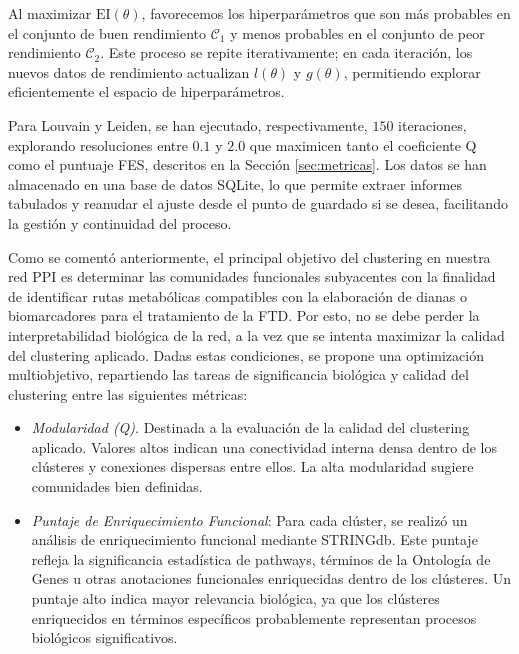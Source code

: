 Al maximizar \( \mathrm{EI}(\theta) \), favorecemos los hiperparámetros que son más probables en el conjunto de buen rendimiento \( \mathcal{C}_1 \) y menos probables en el conjunto de peor rendimiento \( \mathcal{C}_2 \). Este proceso se repite iterativamente; en cada iteración, los nuevos datos de rendimiento actualizan \( l(\theta) \) y \( g(\theta) \), permitiendo explorar eficientemente el espacio de hiperparámetros.

Para Louvain y Leiden, se han ejecutado, respectivamente, \(150\) iteraciones, explorando resoluciones entre \(0.1\) y \(2.0\) que maximicen tanto el coeficiente Q como el puntuaje FES, descritos en la Sección \ref{sec:metricas}. Los datos se han almacenado en una base de datos SQLite, lo que permite extraer informes tabulados y reanudar el ajuste desde el punto de guardado si se desea, facilitando la gestión y continuidad del proceso.


Como se comentó anteriormente, el principal objetivo del clustering en nuestra red PPI es determinar las comunidades funcionales subyacentes con la finalidad de identificar rutas metabólicas compatibles con la elaboración de dianas o biomarcadores para el tratamiento de la FTD. Por esto, no se debe perder la interpretabilidad biológica de la red, a la vez que se intenta maximizar la calidad del clustering aplicado. Dadas estas condiciones, se propone una optimización multiobjetivo, repartiendo las tareas de significancia biológica y calidad del clustering entre las siguientes métricas:

\begin{itemize}
	\item \textit{Modularidad (Q)}. Destinada a la evaluación de la calidad del clustering aplicado. Valores altos indican una conectividad interna densa dentro de los clústeres y conexiones dispersas entre ellos. La alta modularidad sugiere comunidades bien definidas.
	
	\item \textit{Puntaje de Enriquecimiento Funcional}: Para cada clúster, se realizó un análisis de enriquecimiento funcional mediante STRINGdb. Este puntaje refleja la significancia estadística de pathways, términos de la Ontología de Genes u otras anotaciones funcionales enriquecidas dentro de los clústeres. Un puntaje alto indica mayor relevancia biológica, ya que los clústeres enriquecidos en términos específicos probablemente representan procesos biológicos significativos.
\end{itemize}


